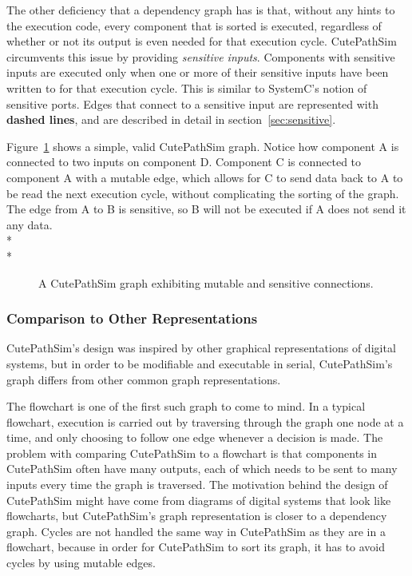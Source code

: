 \documentclass[12pt]{article}
\begin{document}
The other deficiency that a dependency graph has is that, without any hints to the execution code, every component that is sorted is executed, regardless of whether or not its output is even needed for that execution cycle. CutePathSim circumvents this issue by providing \textsl{sensitive inputs}. Components with sensitive inputs are executed only when one or more of their sensitive inputs have been written to for that execution cycle. This is similar to SystemC's notion of sensitive ports. Edges that connect to a sensitive input are represented with \textbf{dashed lines}, and are described in detail in section~\ref{sec:sensitive}.

Figure~\ref{examplegraph} shows a simple, valid CutePathSim graph. Notice how component A is connected to two inputs on component D. Component C is connected to component A with a mutable edge, which allows for C to send data back to A to be read the next execution cycle, without complicating the sorting of the graph. The edge from A to B is sensitive, so B will not be executed if A does not send it any data.
\\*
\\*
\begin{figure}[h]
\centering
{}
\caption{A CutePathSim graph exhibiting mutable and sensitive connections.}
\label{examplegraph}
\end{figure}

\subsubsection{Comparison to Other Representations}
CutePathSim's design was inspired by other graphical representations of digital systems, but in order to be modifiable and executable in serial, CutePathSim's graph differs from other common graph representations.

The flowchart is one of the first such graph to come to mind. In a typical flowchart, execution is carried out by traversing through the graph one node at a time, and only choosing to follow one edge whenever a decision is made. The problem with comparing CutePathSim to a flowchart is that components in CutePathSim often have many outputs, each of which needs to be sent to many inputs every time the graph is traversed. The motivation behind the design of CutePathSim might have come from diagrams of digital systems that look like flowcharts, but CutePathSim's graph representation is closer to a dependency graph. Cycles are not handled the same way in CutePathSim as they are in a flowchart, because in order for CutePathSim to sort its graph, it has to avoid cycles by using mutable edges.
\end{document}
